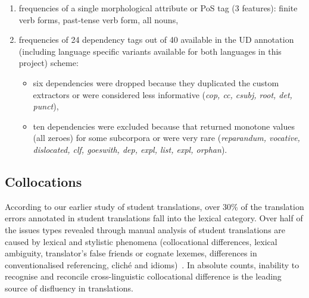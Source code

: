 \begin{enumerate}
	\item frequencies of a single morphological attribute or PoS tag (3 features): finite verb forms, past-tense verb form, all nouns, 
	
	\item frequencies of 24 dependency tags out of 40 available in the UD annotation (including language specific variants available for both languages in this project) scheme:
	\begin{itemize}
		\item six dependencies were dropped because they duplicated the custom extractors or were considered less informative (\textit{cop, cc, csubj, root, det, punct}),
		\item ten dependencies were excluded because that returned monotone values (all zeroes) for some subcorpora or were very rare (\textit{reparandum, vocative, dislocated, clf, goeswith, dep, expl, list, expl, orphan}).
	\end{itemize} 
	
\end{enumerate}

\subsection{\label{ssec:coll}Collocations}


According to our earlier study of student translations, over 30\% of the translation errors annotated in student translations fall into the lexical category. Over half of the issues types revealed through manual analysis of student translations are caused by lexical and stylistic phenomena (collocational differences, lexical ambiguity, translator's false friends or cognate lexemes, differences in conventionalised referencing, cliché and idioms)~\cite[Table 5, p.22]{Kunilovskaya2023err}. In absolute counts, inability to recognise and reconcile cross-linguistic collocational difference is the leading source of disfluency in translations. 

